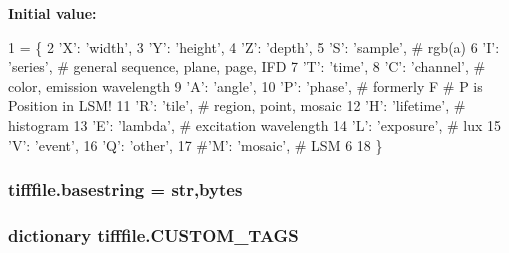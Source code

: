 {\bfseries Initial value\-:}
\begin{DoxyCode}
1 = \{
2     \textcolor{stringliteral}{'X'}: \textcolor{stringliteral}{'width'},
3     \textcolor{stringliteral}{'Y'}: \textcolor{stringliteral}{'height'},
4     \textcolor{stringliteral}{'Z'}: \textcolor{stringliteral}{'depth'},
5     \textcolor{stringliteral}{'S'}: \textcolor{stringliteral}{'sample'},  \textcolor{comment}{# rgb(a)}
6     \textcolor{stringliteral}{'I'}: \textcolor{stringliteral}{'series'},  \textcolor{comment}{# general sequence, plane, page, IFD}
7     \textcolor{stringliteral}{'T'}: \textcolor{stringliteral}{'time'},
8     \textcolor{stringliteral}{'C'}: \textcolor{stringliteral}{'channel'},  \textcolor{comment}{# color, emission wavelength}
9     \textcolor{stringliteral}{'A'}: \textcolor{stringliteral}{'angle'},
10     \textcolor{stringliteral}{'P'}: \textcolor{stringliteral}{'phase'},  \textcolor{comment}{# formerly F    # P is Position in LSM!}
11     \textcolor{stringliteral}{'}\textcolor{stringliteral}{R': '}tile',  # region, point, mosaic
12     \textcolor{stringliteral}{'H'}: \textcolor{stringliteral}{'lifetime'},  \textcolor{comment}{# histogram}
13     \textcolor{stringliteral}{'E'}: \textcolor{stringliteral}{'lambda'},  \textcolor{comment}{# excitation wavelength}
14     \textcolor{stringliteral}{'L'}: \textcolor{stringliteral}{'exposure'},  \textcolor{comment}{# lux}
15     \textcolor{stringliteral}{'V'}: \textcolor{stringliteral}{'event'},
16     \textcolor{stringliteral}{'Q'}: \textcolor{stringliteral}{'other'},
17     \textcolor{comment}{#'M': 'mosaic',  # LSM 6}
18 \}
\end{DoxyCode}
\hypertarget{namespacetifffile_af891e253319a06953c5a9efe383b0ca0}{
\subsubsection[{basestring}]{\setlength{\rightskip}{0pt plus 5cm}tifffile.\-basestring = str,bytes}}\label{namespacetifffile_af891e253319a06953c5a9efe383b0ca0}
\hypertarget{namespacetifffile_a4e8177bd7dbfb24e650a49337b5b9b89}{
\subsubsection[{C\-U\-S\-T\-O\-M\-\_\-\-T\-A\-G\-S}]{\setlength{\rightskip}{0pt plus 5cm}dictionary tifffile.\-C\-U\-S\-T\-O\-M\-\_\-\-T\-A\-G\-S}}\label{namespacetifffile_a4e8177bd7dbfb24e650a49337b5b9b89}
